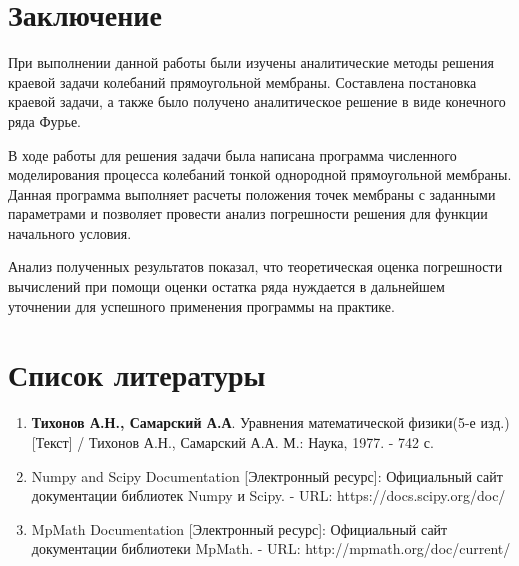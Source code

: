 {{}


\newpage
{}
{}


\section*{Заключение}
{
    При выполнении данной работы были изучены аналитические методы решения краевой задачи колебаний прямоугольной мембраны. Составлена постановка краевой задачи, а также было получено аналитическое решение в виде конечного ряда Фурье.
    
    
    В ходе работы для решения задачи была написана программа численного моделирования процесса колебаний тонкой однородной прямоугольной мембраны. Данная программа выполняет расчеты положения точек мембраны с заданными параметрами и позволяет провести анализ погрешности решения для функции начального условия.
     
     
     Анализ полученных результатов показал, что теоретическая оценка погрешности вычислений при помощи оценки остатка ряда нуждается в дальнейшем уточнении для успешного применения программы на практике. 
    
}

\newpage
{}
{}


\section*{Список литературы}
{
	\begin{enumerate}
    \item \textbf{Тихонов А.Н., Самарский А.А}. Уравнения математической физики(5-е изд.) [Текст]
    / Тихонов А.Н., Самарский А.А. М.: Наука, 1977. - 742 с.\label{src2}
    	\item {Numpy and Scipy Documentation [Электронный ресурс]: Официальный сайт документации библиотек Numpy и Scipy. - URL: https://docs.scipy.org/doc/}\label{src3}
    	\item {MpMath Documentation [Электронный ресурс]: Официальный сайт документации библиотеки MpMath. - URL: http://mpmath.org/doc/current/}\label{src4}
	\end{enumerate}
}

}
